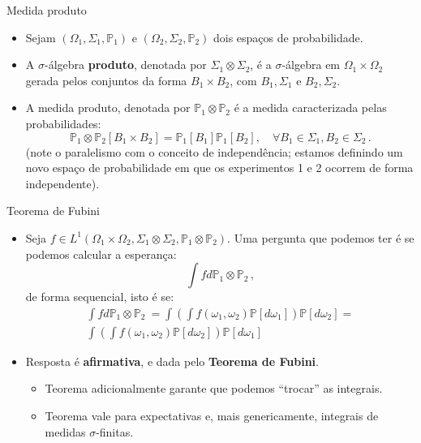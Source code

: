 \documentclass[11pt]{beamer}
\begin{document}
\begin{frame}{Medida produto}
	\begin{itemize}
		\item Sejam $(\Omega_1,\Sigma_1,\mathbb{P}_1)$ e $(\Omega_2,\Sigma_2,\mathbb{P}_2)$ dois espaços de probabilidade.
		\item A $\sigma$-álgebra \textbf{produto}, denotada por $\Sigma_1 \otimes \Sigma_2 $, é a $\sigma$-álgebra em $\Omega_1 \times \Omega_2$ gerada pelos conjuntos da forma $B_1 \times B_2$, com $B_1,\Sigma_1$ e $B_2, \Sigma_2$.
		\item A medida produto, denotada por $\mathbb{P}_1\otimes \mathbb{P}_2$ é a medida caracterizada pelas probabilidades:
		$$\mathbb{P}_1\otimes \mathbb{P}_2[B_1 \times B_2] = \mathbb{P}_1[B_1] \mathbb{P}_1[B_2],\quad \forall B_1 \in \Sigma_1,B_2 \in \Sigma_2\,.$$
		(note o paralelismo com o conceito de independência; estamos definindo um novo espaço de probabilidade em que os experimentos 1 e 2 ocorrem de forma independente).
	
	\end{itemize} 
\end{frame}
\begin{frame}{Teorema de Fubini}
	\begin{itemize}
	\item Seja $f \in L^1(\Omega_1\times \Omega_2,\Sigma_1 \otimes \Sigma_2,  \mathbb{P}_1\otimes \mathbb{P}_2)$. Uma pergunta que podemos ter é se podemos calcular a esperança:
$$\int f d \mathbb{P}_1 \otimes \mathbb{P}_2\,,$$
de forma sequencial, isto é se:
\begin{equation*}
	\begin{aligned}
		\int f d \mathbb{P}_1 \otimes \mathbb{P}_2\ = \int \left(\int f(\omega_1,\omega_2)\mathbb{P}[d\omega_1]\right) \mathbb{P}[d\omega_2] = \\ \int \left(\int f(\omega_1,\omega_2)\mathbb{P}[d\omega_2]\right) \mathbb{P}[d\omega_1] 
	\end{aligned}
\end{equation*}
\item Resposta é \textbf{afirmativa}, e dada pelo \textbf{Teorema de Fubini}.
\begin{itemize}
	\item Teorema adicionalmente garante que podemos ``trocar'' as integrais.
	\item Teorema vale para expectativas e, mais genericamente, integrais de medidas $\sigma$-finitas.
\end{itemize}
\end{itemize}
\end{frame}
\end{document}
